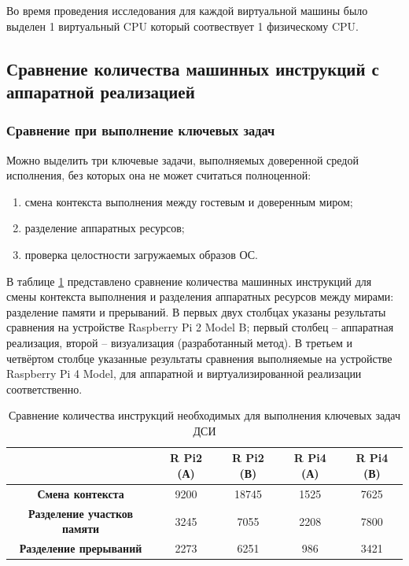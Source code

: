 Во время проведения исследования для каждой виртуальной машины было выделен 1 виртуальный CPU который соотвествует 1 физическому CPU.

\subsection{Сравнение количества машинных инструкций с аппаратной реализацией} 

\subsubsection{Сравнение при выполнение ключевых задач}

Можно выделить три ключевые задачи, выполняемых доверенной средой исполнения, без которых она не может считаться полноценной:

\begin{enumerate}
	\item смена контекста выполнения между гостевым и доверенным миром;
	\item разделение аппаратных ресурсов;
	\item проверка целостности загружаемых образов ОС.
\end{enumerate}

В таблице \ref{table:perf-main-1} представлено сравнение количества машинных инструкций для смены контекста выполнения и разделения аппаратных ресурсов между мирами: разделение памяти и прерываний. В первых двух столбцах указаны результаты сравнения на устройстве Raspberry Pi 2 Model B; первый столбец -- аппаратная реализация, второй -- визуализация (разработанный метод). В третьем и четвёртом столбце указанные результаты сравнения выполняемые на устройстве Raspberry Pi 4 Model, для аппаратной и виртуализированной реализации соответственно.

\begin{table}[!htb]
	\begin{center}
		\caption{Сравнение количества инструкций необходимых для выполнения ключевых задач ДСИ}
		\label{table:perf-main-1}
		\begin{tabular}{|c|c|c|c|c|}
			\hline
			& \bfseries R Pi2 (А) & \bfseries R Pi2 (В) & \bfseries R Pi4 (А) & \bfseries R Pi4 (В)\\
			\hline
			\bfseries Смена контекста & 9200 & 18745 & 1525 & 7625 \\ \hline
			\bfseries Разделение участков памяти & 3245 & 7055 & 2208 & 7800 \\ \hline
			\bfseries Разделение прерываний & 2273 & 6251 & 986 & 3421 \\ \hline	
		\end{tabular}
	\end{center}
\end{table}

